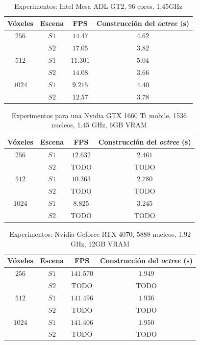 \begin{table}[ht]
\centering
\begin{tabular}{|c|c|c|c|}
	\hline
	\textbf{Vóxeles} & \textbf{Escena} & \textbf{FPS} & \textbf{Construcción del \textit{octree} (s)} \\
	\hline
	$256$ & $S1$ & $14.47$ & $4.62$ \\
	 & $S2$ & $17.05$ & $3.82$ \\
	\hline
	$512$ & $S1$ & $11.301$ & $5.04$ \\
	 & $S2$ & $14.08$ & $3.66$ \\
	\hline
	$1024$ & $S1$ & $9.215$ & $4.40$ \\
	 & $S2$ & $12.57$ & $3.78$ \\
	\hline
\end{tabular}
\caption{Experimentos: Intel Mesa ADL GT2, 96 cores, 1.45GHz}
\label{tab:cisco-laptop}
\end{table}

\begin{table}[hb]
\centering
\begin{tabular}{|c|c|c|c|}
	\hline
	\textbf{Vóxeles} & \textbf{Escena} & \textbf{FPS} & \textbf{Construcción del \textit{octree} (s)} \\
	\hline
	$256$ & $S1$ & $12.632$ & $2.461$ \\
	 & $S2$ & TODO & TODO \\
	\hline
	$512$ & $S1$ & $10.363$ & $2.780$ \\
	 & $S2$ & TODO & TODO \\
	\hline
	$1024$ & $S1$ & $8.825$ & $3.245$ \\
	 & $S2$ & TODO & TODO \\
	\hline
\end{tabular}
\caption{Experimentos para una Nvidia GTX 1660 Ti mobile, 1536 nucleos, 1.45 GHz, 6GB VRAM}
\label{tab:pizzo-laptop}
\end{table}

\begin{table}[hb]
\centering
\begin{tabular}{|c|c|c|c|}
	\hline
	\textbf{Vóxeles} & \textbf{Escena} & \textbf{FPS} & \textbf{Construcción del \textit{octree} (s)} \\
	\hline
	$256$ & $S1$ & $141.570$ & $1.949$ \\
	 & $S2$ & TODO & TODO \\
	\hline
	$512$ & $S1$ & $141.496$ & $1.936$ \\
	 & $S2$ & TODO & TODO \\
	\hline
	$1024$ & $S1$ & $141.406$ & $1.950$ \\
	 & $S2$ & TODO & TODO \\
	\hline
\end{tabular}
\caption{Experimentos: Nvidia Geforce RTX 4070, 5888 nucleos, 1.92 GHz, 12GB VRAM}
\label{tab:pizzo-desktop}
\end{table}

